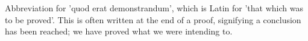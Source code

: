 Abbreviation for 'quod erat demonstrandum', which is Latin for
'that which was to be proved'. This is often written at 
the end of a proof, signifying a conclusion has been reached; 
we have proved what we were intending to.
